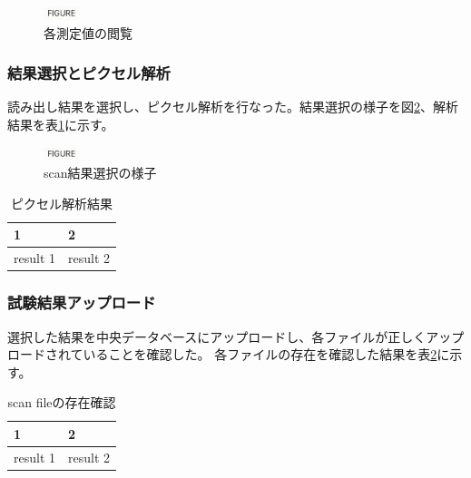 \begin{figure}[bpt]\centering
\includegraphics[width=1cm]{figure}
\caption[各測定値の閲覧]{各測定値の閲覧}
\label{view_dcs}
\end{figure}

\subsubsection{結果選択とピクセル解析}
読み出し結果を選択し、ピクセル解析を行なった。結果選択の様子を図\ref{select_scans}、解析結果を表\ref{pixel_analysis_result}に示す。

\begin{figure}[bpt]\centering
\includegraphics[width=1cm]{figure}
\caption[scan結果選択の様子]{scan結果選択の様子}
\label{select_scans}
\end{figure}

\begin{table}[tbp]
\begin{center}
\caption[ピクセル解析結果]{ピクセル解析結果}
\label{pixel_analysis_result}
  \begin{tabular}{|ll|} \hline
    1 & 2 \\ \hline
    result 1 & result 2 \\ \hline 
  \end{tabular}
\end{center}
\end{table}

\subsubsection{試験結果アップロード}
選択した結果を中央データベースにアップロードし、各ファイルが正しくアップロードされていることを確認した。
各ファイルの存在を確認した結果を表\ref{scan_upload_pd}に示す。

\begin{table}[tbp]
\begin{center}
\caption[scan fileの存在確認]{scan fileの存在確認}
\label{scan_upload_pd}
  \begin{tabular}{|ll|} \hline
    1 & 2 \\ \hline
    result 1 & result 2 \\ \hline 
  \end{tabular}
\end{center}
\end{table}

